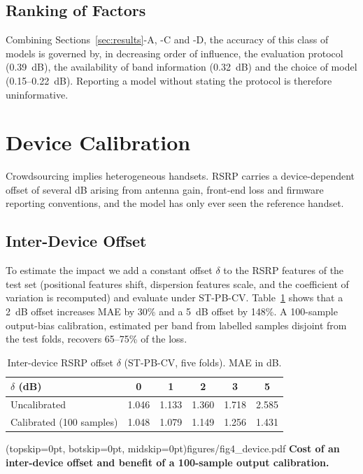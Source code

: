 \documentclass{ieeeaccess}
\begin{document}
\subsection{Ranking of Factors}
Combining Sections~\ref{sec:results}-A, -C and -D, the accuracy of this class of
models is governed by, in decreasing order of influence, the evaluation protocol
(0.39~dB), the availability of band information (0.32~dB) and the choice of model
(0.15--0.22~dB). Reporting a model without stating the protocol is therefore
uninformative.

\section{Device Calibration}
\label{sec:device}
Crowdsourcing implies heterogeneous handsets. RSRP carries a device-dependent
offset of several dB arising from antenna gain, front-end loss and firmware
reporting conventions, and the model has only ever seen the reference handset.

\subsection{Inter-Device Offset}
To estimate the impact we add a constant offset $\delta$ to the RSRP features of
the test set (positional features shift, dispersion features scale, and the
coefficient of variation is recomputed) and evaluate under ST-PB-CV.
Table~\ref{tab:dev} shows that a 2~dB offset increases MAE by 30\% and a 5~dB
offset by 148\%. A 100-sample output-bias calibration, estimated per band from
labelled samples disjoint from the test folds, recovers 65--75\% of the loss.

\begin{table}
\caption{Inter-device RSRP offset $\delta$ (ST-PB-CV, five folds). MAE in dB.}
\label{tab:dev}
\setlength{\tabcolsep}{3pt}
\begin{tabular}{|l|c|c|c|c|c|}
\hline
$\delta$ (dB) & 0 & 1 & 2 & 3 & 5\\
\hline
Uncalibrated & 1.046 & 1.133 & 1.360 & 1.718 & 2.585\\
Calibrated (100 samples) & 1.048 & 1.079 & 1.149 & 1.256 & 1.431\\
\hline
\end{tabular}
\end{table}

\Figure[t!](topskip=0pt, botskip=0pt, midskip=0pt){figures/fig4_device.pdf}
{\textbf{Cost of an inter-device offset and benefit of a 100-sample output
calibration.}\label{fig:dev}}
\end{document}
